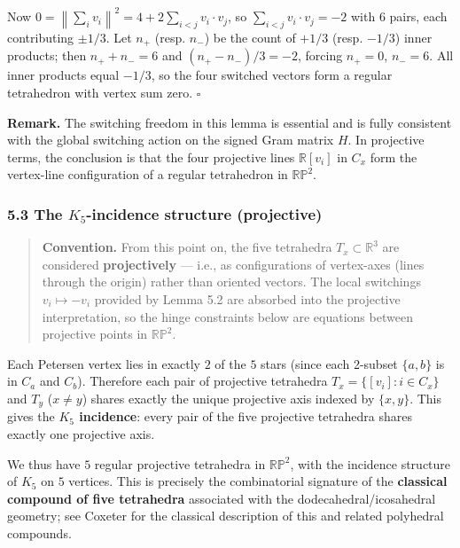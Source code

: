 \documentclass[
]{article}
\begin{document}
Now
\(0 = \left\| \sum_i v_i \right\|^2 = 4 + 2 \sum_{i < j} v_i\cdot v_j\),
so \(\sum_{i < j} v_i\cdot v_j = -2\) with \(6\) pairs, each
contributing \(\pm 1/3\). Let \(n_+\) (resp. \(n_-\)) be the count of
\(+1/3\) (resp. \(-1/3\)) inner products; then \(n_+ + n_- = 6\) and
\((n_+ - n_-)/3 = -2\), forcing \(n_+ = 0\), \(n_- = 6\). All inner
products equal \(-1/3\), so the four switched vectors form a regular
tetrahedron with vertex sum zero. \(\square\)

\textbf{Remark.} The switching freedom in this lemma is essential and is
fully consistent with the global switching action on the signed Gram
matrix \(H\). In projective terms, the conclusion is that the four
projective lines \(\mathbb{R}[v_i]\) in \(C_x\) form the vertex-line
configuration of a regular tetrahedron in \(\mathbb{RP}^2\).

\subsubsection{\texorpdfstring{5.3 The \(K_5\)-incidence structure
(projective)}{5.3 The K\_5-incidence structure (projective)}}\label{the-k_5-incidence-structure-projective}

\begin{quote}
\textbf{Convention.} From this point on, the five tetrahedra
\(T_x \subset \mathbb{R}^3\) are considered \textbf{projectively} ---
i.e., as configurations of vertex-axes (lines through the origin) rather
than oriented vectors. The local switchings \(v_i \mapsto -v_i\)
provided by Lemma 5.2 are absorbed into the projective interpretation,
so the hinge constraints below are equations between projective points
in \(\mathbb{RP}^2\).
\end{quote}

Each Petersen vertex lies in exactly \(2\) of the \(5\) stars (since
each 2-subset \(\{a,b\}\) is in \(C_a\) and \(C_b\)). Therefore each
pair of projective tetrahedra \(T_x = \{[v_i] : i \in C_x\}\) and
\(T_y\) (\(x \neq y\)) shares exactly the unique projective axis indexed
by \(\{x,y\}\). This gives the \textbf{\(K_5\) incidence}: every pair of
the five projective tetrahedra shares exactly one projective axis.

We thus have \(5\) regular projective tetrahedra in \(\mathbb{RP}^2\),
with the incidence structure of \(K_5\) on \(5\) vertices. This is
precisely the combinatorial signature of the \textbf{classical compound
of five tetrahedra} associated with the dodecahedral/icosahedral
geometry; see Coxeter \cite{Cox73} for the classical description of this
and related polyhedral compounds.
\end{document}
